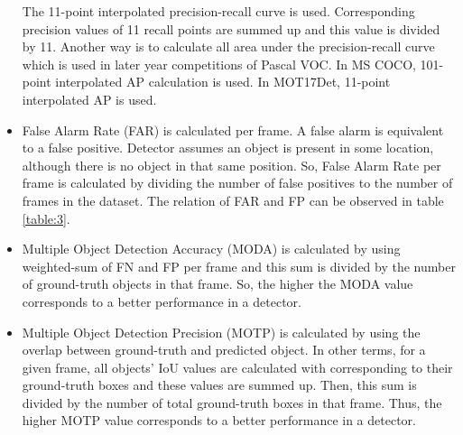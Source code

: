 \documentclass{article}
\begin{document}
\begin{itemize}
    The 11-point interpolated precision-recall curve is used. Corresponding precision values of 11 recall 
    points are summed up and this value is divided by 11. Another way is to calculate all area under 
    the precision-recall curve which is used in later year competitions of Pascal VOC. In MS COCO, 
    101-point interpolated AP calculation is used. In MOT17Det, 11-point interpolated AP is used.
    \item False Alarm Rate (FAR) is calculated per frame. A false alarm is equivalent to a false positive. 
    Detector assumes an object is present in some location, although there is no object in that same position. 
    So, False Alarm Rate per frame is calculated by dividing the number of false positives to the number of 
    frames in the dataset. The relation of FAR and FP can be observed in table \ref{table:3}.
    \item Multiple Object Detection Accuracy (MODA) is calculated by using weighted-sum of FN and 
    FP per frame and this sum is divided by the number of ground-truth objects in that frame. So, the 
    higher the MODA value corresponds to a better performance in a detector.
    \item Multiple Object Detection Precision (MOTP) is calculated by using the overlap between ground-truth 
    and predicted object. In other terms, for a given frame, all objects' IoU values are calculated with 
    corresponding to their ground-truth boxes and these values are summed up. Then, this sum is divided by 
    the number of total ground-truth boxes in that frame. Thus, the higher MOTP value corresponds to a better 
    performance in a detector. 
\end{itemize}
\end{document}
